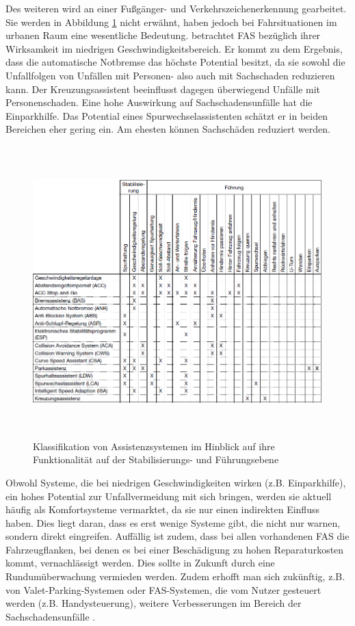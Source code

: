 Des weiteren wird an einer Fußgänger- und Verkehrszeichenerkennung gearbeitet. Sie werden in Abbildung \ref{fig:FAS} nicht erwähnt, haben jedoch bei Fahrsituationen im urbanen Raum eine wesentliche Bedeutung. \Textcite[S. 52]{Gschwendtner.2015} betrachtet \ac{FAS} bezüglich ihrer Wirksamkeit im niedrigen Geschwindigkeitsbereich. Er kommt zu dem Ergebnis, dass die automatische Notbremse das höchste Potential besitzt, da sie sowohl die Unfallfolgen von Unfällen mit Personen- also auch mit Sachschaden reduzieren kann. Der Kreuzungsassistent beeinflusst dagegen überwiegend Unfälle mit Personenschaden. Eine hohe Auswirkung auf Sachschadensunfälle hat die Einparkhilfe. Das Potential eines Spurwechselassistenten schätzt er in beiden Bereichen eher gering ein. Am ehesten können Sachschäden reduziert werden.

\begin{savenotes}
	\begin{figure}[H]
		\centering
		\includegraphics[width=15cm,height=11.25cm]{figures/FAS}
		\caption[Klassifikation von Assistenzsystemen im Hinblick auf ihre Funktionalität auf der Stabilisierungs- und Führungsebene]{Klassifikation von Assistenzsystemen im Hinblick auf ihre Funktionalität auf der Stabilisierungs- und Führungsebene \parencite[S. 31]{Vollrath.2006}}\label{fig:FAS}
	\end{figure}
\end{savenotes}

Obwohl Systeme, die bei niedrigen Geschwindigkeiten wirken (z.B. Einparkhilfe), ein hohes Potential zur Unfallvermeidung mit sich bringen, werden sie aktuell häufig als Komfortsysteme vermarktet, da sie nur einen indirekten Einfluss haben. Dies liegt daran, dass es erst wenige Systeme gibt, die nicht nur warnen, sondern direkt eingreifen. Auffällig ist zudem, dass bei allen vorhandenen \ac{FAS} die Fahrzeugflanken, bei denen es bei einer Beschädigung zu hohen Reparaturkosten kommt, vernachlässigt werden. Dies sollte in Zukunft durch eine Rundumüberwachung vermieden werden. Zudem erhofft man sich zukünftig, z.B. von Valet-Parking-Systemen oder FAS-Systemen, die vom Nutzer gesteuert werden (z.B. Handysteuerung), weitere Verbesserungen im Bereich der Sachschadensunfälle \parencite[S. 18-21]{Gschwendtner.2015}.

